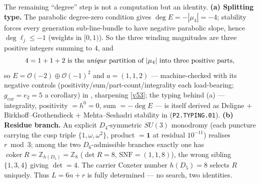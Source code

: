 \documentclass[11pt,a4paper]{article}
\newcommand{\gcar}{g_{\mathrm{car}}}
\newcommand{\Z}{\mathbb{Z}}
\theoremstyle{definition}
\begin{document}
\begin{winbox}
The remaining ``degree'' step is not a computation but an identity. \textbf{(a) Splitting type.} The
parabolic degree-zero condition gives $\deg E=-|\mu_4|=-4$; stability forces every generation
sub-line-bundle to have negative parabolic slope, hence $\deg\ell_j\le-1$ (weights in $[0,1)$). So the
three winding magnitudes are three positive integers summing to $4$, and
\[
  4=1+1+2\ \text{is the \emph{unique} partition of $|\mu_4|$ into three positive parts,}
\]
so $E=\mathcal O(-2)\oplus\mathcal O(-1)^2$ and $a=(1,1,2)$ --- machine-checked with its negative
controls (positivity/sum/part-count/integrality each load-bearing; $\gcar=e_2=5$ a corollary) in
, sharpening \vref{v53}; the typing behind (a) --- integrality,
positivity $=h^0{=}0$, sum $=-\deg E$ --- is itself derived as Deligne $+$ Birkhoff--Grothendieck $+$
Mehta--Seshadri stability in  (\texttt{P2.TYPING.01}).
\textbf{(b) Residue branch.} An explicit $D_4$-symmetric $SU(3)$ monodromy (each puncture carrying the
cusp triple $\{1,\omega,\omega^2\}$, product $=\mathbf1$ at residual $10^{-11}$) realises $r\bmod3$; among
the two $D_6$-admissible branches exactly one has $\operatorname{coker}R=\Z_{h(D_5)}=\Z_8$
($\det R=8$, $\mathrm{SNF}=(1,1,8)$), the wrong sibling $\{1,3,4\}$ giving $\det=4$. The carrier Coxeter
number $h(D_5)=8$ selects $R$ uniquely. Thus $L=6n+r$ is fully determined --- no search, two identities. \mE
\end{winbox}
\end{document}
